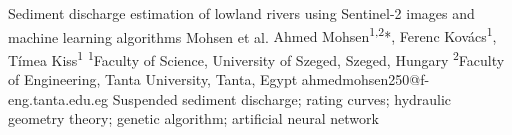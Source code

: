\abstract
{Sediment discharge estimation of lowland rivers using Sentinel-2 images and machine learning algorithms} 
{Mohsen et al.} 
{Ahmed Mohsen\textsuperscript{1,2}*, Ferenc Kovács\textsuperscript{1}, Tímea Kiss\textsuperscript{1}} 
{\TLtag} 
{
\textsuperscript{1}Faculty of Science, University of Szeged, Szeged, Hungary 
\textsuperscript{2}Faculty of Engineering, Tanta University, Tanta, Egypt
}
{ahmed\textunderscore mohsen250@f-eng.tanta.edu.eg}  %
{Suspended sediment discharge; rating curves; hydraulic geometry theory; genetic algorithm; artificial neural network}
